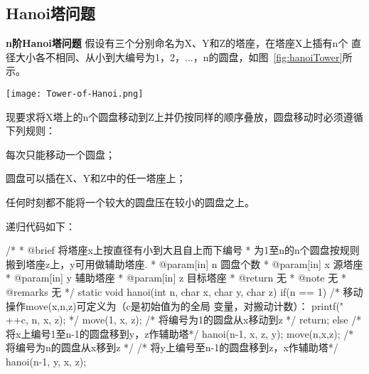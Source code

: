 \subsection{Hanoi塔问题}

\textbf{n阶Hanoi塔问题} 假设有三个分别命名为X、Y和Z的塔座，在塔座X上插有n个
直径大小各不相同、从小到大编号为1，2，...，n的圆盘，如图~\ref{fig:hanoiTower}所示。

\begin{center}
\texttt{[image: Tower-of-Hanoi.png]}\\
\label{fig:hanoiTower}
\end{center}


现要求将X塔上的n个圆盘移动到Z上并仍按同样的顺序叠放，圆盘移动时必须遵循下列规则：
\begindot
\item 每次只能移动一个圆盘；
\item 圆盘可以插在X、Y和Z中的任一塔座上；
\item 任何时刻都不能将一个较大的圆盘压在较小的圆盘之上。
\myenddot

递归代码如下：
\begin{Codex}[label=hanoi.c]
/*
 * @brief 将塔座x上按直径有小到大且自上而下编号
 * 为1至n的n个圆盘按规则搬到塔座z上，y可用做辅助塔座.
 * @param[in] n 圆盘个数
 * @param[in] x 源塔座
 * @param[in] y 辅助塔座
 * @param[in] z 目标塔座
 * @return 无
 * @note 无
 * @remarks 无
 */
static void hanoi(int n, char x, char y, char z)
{
    if(n ==  1) {
        /* 移动操作move(x,n,z)可定义为（c是初始值为的全局
           变量，对搬动计数）：
           printf("%
                                        ++c, n, x, z);
        */
        move(1, x, z); /* 将编号为1的圆盘从x移动到z */
        return;
    } else {
        /* 将x上编号1至n-1的圆盘移到y，z作辅助塔*/
        hanoi(n-1, x, z, y); 
        move(n,x,z);  /* 将编号为n的圆盘从x移到z */
        /* 将y上编号至n-1的圆盘移到z，x作辅助塔*/
        hanoi(n-1, y, x, z); 
    }
}
\end{Codex}

